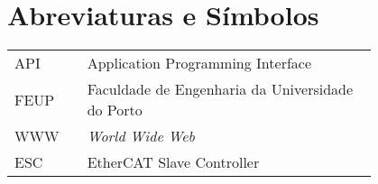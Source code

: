 \chapter*{Abreviaturas e Símbolos}

\begin{flushleft}
\begin{tabular}{l p{0.8\linewidth}}
API      & Application Programming Interface\\
FEUP     & Faculdade de Engenharia da Universidade do Porto\\
WWW      & \emph{World Wide Web}\\
ESC      & EtherCAT Slave Controller\\
\end{tabular}
\end{flushleft}

